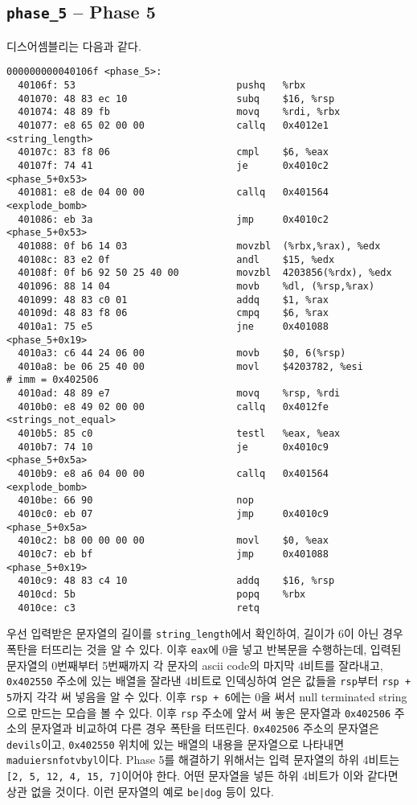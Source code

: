 \documentclass{scrartcl}
\begin{document}
\subsection{\texttt{phase\_5} -- Phase 5}
디스어셈블리는 다음과 같다.
\begin{lstlisting}
000000000040106f <phase_5>:
  40106f: 53                            pushq   %rbx
  401070: 48 83 ec 10                   subq    $16, %rsp
  401074: 48 89 fb                      movq    %rdi, %rbx
  401077: e8 65 02 00 00                callq   0x4012e1 <string_length>
  40107c: 83 f8 06                      cmpl    $6, %eax
  40107f: 74 41                         je      0x4010c2 <phase_5+0x53>
  401081: e8 de 04 00 00                callq   0x401564 <explode_bomb>
  401086: eb 3a                         jmp     0x4010c2 <phase_5+0x53>
  401088: 0f b6 14 03                   movzbl  (%rbx,%rax), %edx
  40108c: 83 e2 0f                      andl    $15, %edx
  40108f: 0f b6 92 50 25 40 00          movzbl  4203856(%rdx), %edx
  401096: 88 14 04                      movb    %dl, (%rsp,%rax)
  401099: 48 83 c0 01                   addq    $1, %rax
  40109d: 48 83 f8 06                   cmpq    $6, %rax
  4010a1: 75 e5                         jne     0x401088 <phase_5+0x19>
  4010a3: c6 44 24 06 00                movb    $0, 6(%rsp)
  4010a8: be 06 25 40 00                movl    $4203782, %esi          # imm = 0x402506
  4010ad: 48 89 e7                      movq    %rsp, %rdi
  4010b0: e8 49 02 00 00                callq   0x4012fe <strings_not_equal>
  4010b5: 85 c0                         testl   %eax, %eax
  4010b7: 74 10                         je      0x4010c9 <phase_5+0x5a>
  4010b9: e8 a6 04 00 00                callq   0x401564 <explode_bomb>
  4010be: 66 90                         nop
  4010c0: eb 07                         jmp     0x4010c9 <phase_5+0x5a>
  4010c2: b8 00 00 00 00                movl    $0, %eax
  4010c7: eb bf                         jmp     0x401088 <phase_5+0x19>
  4010c9: 48 83 c4 10                   addq    $16, %rsp
  4010cd: 5b                            popq    %rbx
  4010ce: c3                            retq
\end{lstlisting}
우선 입력받은 문자열의 길이를 \texttt{string\_length}에서 확인하여, 길이가 6이
아닌 경우 폭탄을 터뜨리는 것을 알 수 있다. 이후 \texttt{eax}에 0을 넣고
반복문을 수행하는데, 입력된 문자열의 0번째부터 5번째까지 각 문자의 ascii code의
마지막 4비트를 잘라내고, \texttt{0x402550} 주소에 있는 배열을 잘라낸 4비트로
인덱싱하여 얻은 값들을 \texttt{rsp}부터 \texttt{rsp + 5}까지 각각 써 넣음을 알
수 있다. 이후 \texttt{rsp + 6}에는 0을 써서 null terminated string으로 만드는
모습을 볼 수 있다. 이후 \texttt{rsp} 주소에 앞서 써 놓은 문자열과
\texttt{0x402506} 주소의 문자열과 비교하여 다른 경우 폭탄을 터뜨린다.
\texttt{0x402506} 주소의 문자열은 \texttt{devils}이고, \texttt{0x402550} 위치에
있는 배열의 내용을 문자열으로 나타내면 \texttt{maduiersnfotvbyl}이다. Phase 5를
해결하기 위해서는 입력 문자열의 하위 4비트는 \texttt{[2, 5, 12, 4, 15,
7]}이어야 한다. 어떤 문자열을 넣든 하위 4비트가 이와 같다면 상관 없을 것이다.
이런 문자열의 예로 \texttt{be|dog} 등이 있다.
\end{document}

